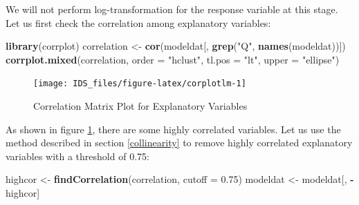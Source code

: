 \documentclass[12pt,]{krantz}
\makeatletter
\newenvironment{Shaded}{\begin{snugshade}}{\end{snugshade}}
\newcommand{\CommentTok}[1]{\textcolor[rgb]{0.37,0.37,0.37}{\textit{#1}}}
\newcommand{\DataTypeTok}[1]{\textcolor[rgb]{0.27,0.27,0.27}{#1}}
\newcommand{\FloatTok}[1]{\textcolor[rgb]{0.06,0.06,0.06}{#1}}
\newcommand{\KeywordTok}[1]{\textcolor[rgb]{0.27,0.27,0.27}{\textbf{#1}}}
\newcommand{\NormalTok}[1]{#1}
\newcommand{\OperatorTok}[1]{\textcolor[rgb]{0.43,0.43,0.43}{\textbf{#1}}}
\newcommand{\StringTok}[1]{\textcolor[rgb]{0.5,0.5,0.5}{#1}}
\newenvironment{kframe}{%
\medskip{}
\setlength{\fboxsep}{.8em}
 \def\at@end@of@kframe{}%
 \ifinner\ifhmode%
  \def\at@end@of@kframe{\end{minipage}}%
  \begin{minipage}{\columnwidth}%
 \fi\fi%
 \def\FrameCommand##1{\hskip\@totalleftmargin \hskip-\fboxsep
 \colorbox{shadecolor}{##1}\hskip-\fboxsep
     \hskip-\linewidth \hskip-\@totalleftmargin \hskip\columnwidth}%
 \MakeFramed {\advance\hsize-\width
   \@totalleftmargin\z@ \linewidth\hsize
   \@setminipage}}%
 {\par\unskip\endMakeFramed%
 \at@end@of@kframe}
\renewenvironment{Shaded}{\begin{kframe}}{\end{kframe}}
\makeatother
\begin{document}
\begin{Shaded}
\end{Shaded}

We will not perform log-transformation for the response variable at this stage. Let us first check the correlation among explanatory variables:

\begin{Shaded}
\begin{Highlighting}[]
\KeywordTok{library}\NormalTok{(corrplot)}
\NormalTok{correlation <-}\StringTok{ }\KeywordTok{cor}\NormalTok{(modeldat[, }\KeywordTok{grep}\NormalTok{(}\StringTok{"Q"}\NormalTok{, }\KeywordTok{names}\NormalTok{(modeldat))])}
\KeywordTok{corrplot.mixed}\NormalTok{(correlation, }\DataTypeTok{order =} \StringTok{"hclust"}\NormalTok{, }\DataTypeTok{tl.pos =} \StringTok{"lt"}\NormalTok{, }
    \DataTypeTok{upper =} \StringTok{"ellipse"}\NormalTok{)}
\end{Highlighting}
\end{Shaded}

\begin{figure}

{\centering \texttt{[image: IDS\_files/figure-latex/corplotlm-1]} 

}

\caption{Correlation Matrix Plot for Explanatory Variables}\label{fig:corplotlm}
\end{figure}

As shown in figure \ref{fig:corplotlm}, there are some highly correlated variables. Let us use the method described in section \ref{collinearity} to remove highly correlated explanatory variables with a threshold of 0.75:

\begin{Shaded}
\begin{Highlighting}[]
\NormalTok{highcor <-}\StringTok{ }\KeywordTok{findCorrelation}\NormalTok{(correlation, }\DataTypeTok{cutoff =} \FloatTok{0.75}\NormalTok{)}
\NormalTok{modeldat <-}\StringTok{ }\NormalTok{modeldat[, }\OperatorTok{-}\NormalTok{highcor]}
\end{Highlighting}
\end{Shaded}
\end{document}
